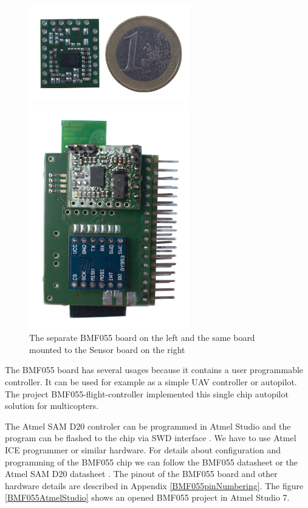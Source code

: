 \begin{figure}
	\centering
	\label{BMF055photo}
	\caption{The separate BMF055 board on the left and the same board mounted to the Sensor board on the right}
	\begin{minipage}[c]{.45\textwidth}
		\includegraphics[width=7cm]{img/BMF055.jpg}
	\end{minipage}
	\vrule{}
	\begin{minipage}[c]{.45\textwidth}
		\includegraphics[width=7cm]{img/HWassembledNoCoin.jpg}
	\end{minipage}
\end{figure}

The BMF055 board has several usages because it contains a user programmable controller. It can be used for example as a simple UAV controller or autopilot. The project BMF055-flight-controller \cite{BMF055flightController} implemented this single chip autopilot solution for multicopters.

The Atmel SAM D20 controler \cite{atmel:samd20} can be programmed in Atmel Studio \cite{AtmelStudio} and the program can be flashed to the chip via \ac{SWD} interface \cite{SWDinterface}. We have to use Atmel ICE programmer \cite{AtmelICE} or similar hardware. For details about configuration and programming of the BMF055 chip we can follow the BMF055 datasheet \cite{bosch:BMF055} or the Atmel SAM D20 datasheet \cite{atmel:samd20}. The pinout of the BMF055 board and other hardware details are described in Appendix \ref{BMF055pinNumbering}. The figure \ref{BMF055AtmelStudio} shows an opened BMF055 project in Atmel Studio 7.

